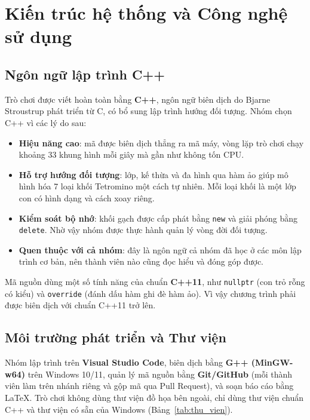 \section{Kiến trúc hệ thống và Công nghệ sử dụng}

\subsection{Ngôn ngữ lập trình C++}

Trò chơi được viết hoàn toàn bằng \textbf{C++}, ngôn ngữ biên dịch do Bjarne Stroustrup phát triển từ C, có bổ sung lập trình hướng đối tượng. Nhóm chọn C++ vì các lý do sau:

\begin{itemize}
    \item \textbf{Hiệu năng cao}: mã được biên dịch thẳng ra mã máy, vòng lặp trò chơi chạy khoảng 33 khung hình mỗi giây mà gần như không tốn CPU.
    \item \textbf{Hỗ trợ hướng đối tượng}: lớp, kế thừa và đa hình qua hàm ảo giúp mô hình hóa 7 loại khối Tetromino một cách tự nhiên. Mỗi loại khối là một lớp con có hình dạng và cách xoay riêng.
    \item \textbf{Kiểm soát bộ nhớ}: khối gạch được cấp phát bằng \texttt{new} và giải phóng bằng \texttt{delete}. Nhờ vậy nhóm được thực hành quản lý vòng đời đối tượng.
    \item \textbf{Quen thuộc với cả nhóm}: đây là ngôn ngữ cả nhóm đã học ở các môn lập trình cơ bản, nên thành viên nào cũng đọc hiểu và đóng góp được.
\end{itemize}

Mã nguồn dùng một số tính năng của chuẩn \textbf{C++11}, như \texttt{nullptr} (con trỏ rỗng có kiểu) và \texttt{override} (đánh dấu hàm ghi đè hàm ảo). Vì vậy chương trình phải được biên dịch với chuẩn C++11 trở lên.

\subsection{Môi trường phát triển và Thư viện}

Nhóm lập trình trên \textbf{Visual Studio Code}, biên dịch bằng \textbf{G++ (MinGW-w64)} trên Windows 10/11, quản lý mã nguồn bằng \textbf{Git/GitHub} (mỗi thành viên làm trên nhánh riêng và gộp mã qua Pull Request), và soạn báo cáo bằng \LaTeX. Trò chơi không dùng thư viện đồ họa bên ngoài, chỉ dùng thư viện chuẩn C++ và thư viện có sẵn của Windows (Bảng~\ref{tab:thu_vien}).

